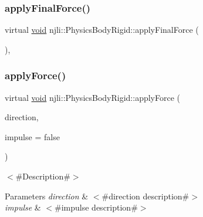\subsubsection{\texorpdfstring{apply\+Final\+Force()}{applyFinalForce()}}
{\footnotesize\ttfamily virtual \mbox{\hyperlink{_thread_8h_af1e856da2e658414cb2456cb6f7ebc66}{void}} njli\+::\+Physics\+Body\+Rigid\+::apply\+Final\+Force (\begin{DoxyParamCaption}{ }\end{DoxyParamCaption})\hspace{0.3cm}{\ttfamily [protected]}, {\ttfamily [virtual]}}

\mbox{\label{classnjli_1_1_physics_body_rigid_a48e65253892e04f83648e9e9fde34f69}} 
\subsubsection{\texorpdfstring{apply\+Force()}{applyForce()}\hspace{0.1cm}{\footnotesize\ttfamily [1/2]}}
{\footnotesize\ttfamily virtual \mbox{\hyperlink{_thread_8h_af1e856da2e658414cb2456cb6f7ebc66}{void}} njli\+::\+Physics\+Body\+Rigid\+::apply\+Force (\begin{DoxyParamCaption}\item[{const bt\+Vector3 \&}]{direction,  }\item[{bool}]{impulse = {\ttfamily false} }\end{DoxyParamCaption})\hspace{0.3cm}{\ttfamily [virtual]}}

$<$\#\+Description\#$>$


\begin{DoxyParams}{Parameters}
{\em direction} & $<$\#direction description\#$>$ \\
\hline
{\em impulse} & $<$\#impulse description\#$>$ \\
\hline
\end{DoxyParams}
\mbox{\label{classnjli_1_1_physics_body_rigid_a905d2e7b94681a30744a32f134611c15}} 

